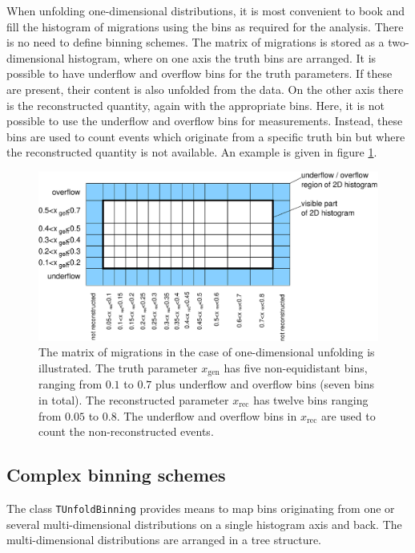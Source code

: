 \documentclass[12pt]{article}
\newlength{\figwidth}
\begin{document}
When unfolding one-dimensional distributions, it is most convenient to
book and fill the histogram of migrations using the bins as required for the
analysis. There is no need to define binning schemes.
The matrix of migrations is stored as a two-dimensional histogram, where on
one axis the truth bins are arranged. It is possible to have underflow
and overflow bins for the truth parameters. If these are present,
their content is also unfolded from the data.
On the other axis there is the reconstructed quantity, again with the
appropriate bins. Here, it is not possible to use the underflow and overflow
bins for measurements. Instead, these bins are used to count events
which originate from a specific truth bin but where the reconstructed quantity
is not available. An example is given in figure \ref{fig:unfold1dim}.
\begin{figure}
\begin{center}
\includegraphics[width=0.7\figwidth]{fig/tunfold_manual_fig2.eps}
\end{center}
\caption{\label{fig:unfold1dim} The matrix of migrations in the case of
  one-dimensional unfolding 
  is illustrated. The truth parameter $x_{\text{gen}}$ has five
  non-equidistant bins, 
  ranging from $0.1$ to $0.7$ plus underflow and overflow bins (seven bins in
  total).
  The reconstructed parameter $x_{\text{rec}}$ has twelve
  bins ranging from $0.05$ to $0.8$. The underflow and overflow bins in
  $x_{\text{rec}}$ are used to count the non-reconstructed events.
}
\end{figure}

\subsection{Complex binning schemes}

The class {\tt TUnfoldBinning} provides means to map bins originating from 
one or several multi-dimensional distributions on a single histogram
axis and back. The multi-dimensional distributions are arranged in a
tree structure.
\end{document}
